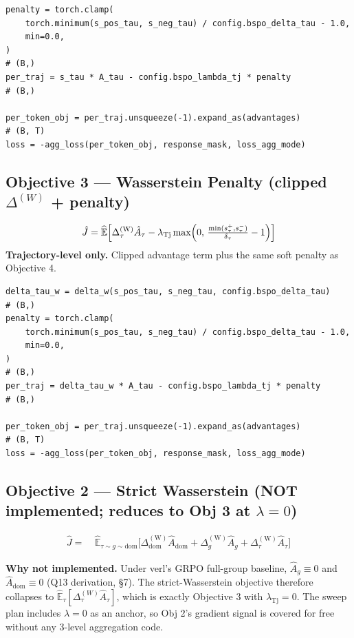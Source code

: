 \documentclass{article}
\begin{document}
\begin{lstlisting}[caption={Objective 4 --- penalty only}]
penalty = torch.clamp(
    torch.minimum(s_pos_tau, s_neg_tau) / config.bspo_delta_tau - 1.0,
    min=0.0,
)                                                                        # (B,)
per_traj = s_tau * A_tau - config.bspo_lambda_tj * penalty               # (B,)

per_token_obj = per_traj.unsqueeze(-1).expand_as(advantages)             # (B, T)
loss = -agg_loss(per_token_obj, response_mask, loss_agg_mode)
\end{lstlisting}

\subsection{Objective 3 --- Wasserstein Penalty (clipped $\Delta^{(W)}$ + penalty)}
\[
\hat J = \widehat{\mathbb{E}}
  \Bigl[ \Delta_\tau^{(\text{W})} \hat A_\tau
       - \lambda_{\text{Tj}} \max\Bigl(0,\, \tfrac{\min(s_\tau^+, s_\tau^-)}{\delta_\tau} - 1\Bigr) \Bigr]
\]
\textbf{Trajectory-level only.} Clipped advantage term plus the same soft
penalty as Objective 4.

\begin{lstlisting}[caption={Objective 3 --- W + penalty, traj only}]
delta_tau_w = delta_w(s_pos_tau, s_neg_tau, config.bspo_delta_tau)       # (B,)
penalty = torch.clamp(
    torch.minimum(s_pos_tau, s_neg_tau) / config.bspo_delta_tau - 1.0,
    min=0.0,
)                                                                        # (B,)
per_traj = delta_tau_w * A_tau - config.bspo_lambda_tj * penalty         # (B,)

per_token_obj = per_traj.unsqueeze(-1).expand_as(advantages)             # (B, T)
loss = -agg_loss(per_token_obj, response_mask, loss_agg_mode)
\end{lstlisting}

\subsection{Objective 2 --- Strict Wasserstein (NOT implemented; reduces to Obj 3 at $\lambda=0$)}
\begin{align*}
\hat J =\ & \widehat{\mathbb{E}}_{\tau \sim g \sim \text{dom}}
  \bigl[\Delta_{\text{dom}}^{(\text{W})} \hat A_{\text{dom}}
      + \Delta_g^{(\text{W})} \hat A_g
      + \Delta_\tau^{(\text{W})} \hat A_\tau\bigr]
\end{align*}

\textbf{Why not implemented.} Under verl's GRPO full-group baseline,
$\hat A_g \equiv 0$ and $\hat A_\text{dom} \equiv 0$ (Q13 derivation, \S7).
The strict-Wasserstein objective therefore collapses to
$\widehat{\mathbb{E}}_\tau [\Delta_\tau^{(W)} \hat A_\tau]$, which is
exactly Objective 3 with $\lambda_{\text{Tj}} = 0$. The sweep plan
includes $\lambda = 0$ as an anchor, so Obj 2's gradient signal is
covered for free without any 3-level aggregation code.
\end{document}
